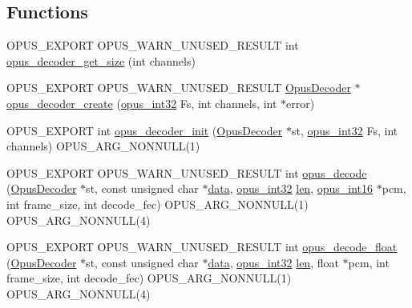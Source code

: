 \subsection*{Functions}
\begin{DoxyCompactItemize}
\item 
O\+P\+U\+S\+\_\+\+E\+X\+P\+O\+RT O\+P\+U\+S\+\_\+\+W\+A\+R\+N\+\_\+\+U\+N\+U\+S\+E\+D\+\_\+\+R\+E\+S\+U\+LT int \mbox{\hyperlink{group__opus__decoder_gaee52cd75f7160fda7a0916d72363940b}{opus\+\_\+decoder\+\_\+get\+\_\+size}} (int channels)
\item 
O\+P\+U\+S\+\_\+\+E\+X\+P\+O\+RT O\+P\+U\+S\+\_\+\+W\+A\+R\+N\+\_\+\+U\+N\+U\+S\+E\+D\+\_\+\+R\+E\+S\+U\+LT \mbox{\hyperlink{group__opus__decoder_ga401d8579958d36094715a6b90cd159a6}{Opus\+Decoder}} $\ast$ \mbox{\hyperlink{group__opus__decoder_ga6a06f16309dee5883c27223d127c4300}{opus\+\_\+decoder\+\_\+create}} (\mbox{\hyperlink{opus__types_8h_aa4d309d6f80b99dbabebc8f98879ab9a}{opus\+\_\+int32}} Fs, int channels, int $\ast$error)
\item 
O\+P\+U\+S\+\_\+\+E\+X\+P\+O\+RT int \mbox{\hyperlink{group__opus__decoder_ga40746b48a7b1653987a3a6db2ce3a40b}{opus\+\_\+decoder\+\_\+init}} (\mbox{\hyperlink{group__opus__decoder_ga401d8579958d36094715a6b90cd159a6}{Opus\+Decoder}} $\ast$st, \mbox{\hyperlink{opus__types_8h_aa4d309d6f80b99dbabebc8f98879ab9a}{opus\+\_\+int32}} Fs, int channels) O\+P\+U\+S\+\_\+\+A\+R\+G\+\_\+\+N\+O\+N\+N\+U\+LL(1)
\item 
O\+P\+U\+S\+\_\+\+E\+X\+P\+O\+RT O\+P\+U\+S\+\_\+\+W\+A\+R\+N\+\_\+\+U\+N\+U\+S\+E\+D\+\_\+\+R\+E\+S\+U\+LT int \mbox{\hyperlink{group__opus__decoder_ga3df1ea406cd9d23a63aed181903d3e5e}{opus\+\_\+decode}} (\mbox{\hyperlink{group__opus__decoder_ga401d8579958d36094715a6b90cd159a6}{Opus\+Decoder}} $\ast$st, const unsigned char $\ast$\mbox{\hyperlink{_s_d_l__opengl_8h_a2e335d56e2846b0fea47eed068b2d34a}{data}}, \mbox{\hyperlink{opus__types_8h_aa4d309d6f80b99dbabebc8f98879ab9a}{opus\+\_\+int32}} \mbox{\hyperlink{_s_d_l__opengl__glext_8h_a652168017ea9a8bbcead03d5c16269fb}{len}}, \mbox{\hyperlink{opus__types_8h_acc9ed7cf60479eb81f9648c6ec27dc26}{opus\+\_\+int16}} $\ast$pcm, int frame\+\_\+size, int decode\+\_\+fec) O\+P\+U\+S\+\_\+\+A\+R\+G\+\_\+\+N\+O\+N\+N\+U\+LL(1) O\+P\+U\+S\+\_\+\+A\+R\+G\+\_\+\+N\+O\+N\+N\+U\+LL(4)
\item 
O\+P\+U\+S\+\_\+\+E\+X\+P\+O\+RT O\+P\+U\+S\+\_\+\+W\+A\+R\+N\+\_\+\+U\+N\+U\+S\+E\+D\+\_\+\+R\+E\+S\+U\+LT int \mbox{\hyperlink{group__opus__decoder_gafe994758c0d6fa49cd38d63331d47bd4}{opus\+\_\+decode\+\_\+float}} (\mbox{\hyperlink{group__opus__decoder_ga401d8579958d36094715a6b90cd159a6}{Opus\+Decoder}} $\ast$st, const unsigned char $\ast$\mbox{\hyperlink{_s_d_l__opengl_8h_a2e335d56e2846b0fea47eed068b2d34a}{data}}, \mbox{\hyperlink{opus__types_8h_aa4d309d6f80b99dbabebc8f98879ab9a}{opus\+\_\+int32}} \mbox{\hyperlink{_s_d_l__opengl__glext_8h_a652168017ea9a8bbcead03d5c16269fb}{len}}, float $\ast$pcm, int frame\+\_\+size, int decode\+\_\+fec) O\+P\+U\+S\+\_\+\+A\+R\+G\+\_\+\+N\+O\+N\+N\+U\+LL(1) O\+P\+U\+S\+\_\+\+A\+R\+G\+\_\+\+N\+O\+N\+N\+U\+LL(4)

\end{DoxyCompactItemize}
